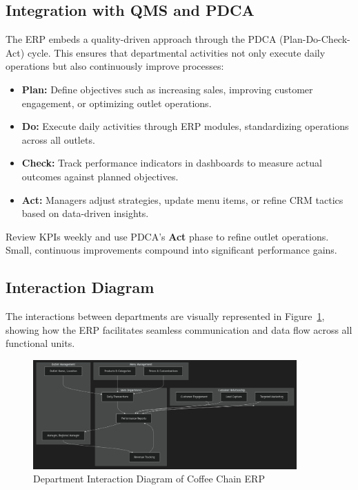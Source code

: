 \subsection*{Integration with QMS and PDCA}
The ERP embeds a quality-driven approach through the PDCA (Plan-Do-Check-Act) cycle. This ensures that departmental activities not only execute daily operations but also continuously improve processes:
\begin{itemize}
    \item \textbf{Plan:} Define objectives such as increasing sales, improving customer engagement, or optimizing outlet operations.
    \item \textbf{Do:} Execute daily activities through ERP modules, standardizing operations across all outlets.
    \item \textbf{Check:} Track performance indicators in dashboards to measure actual outcomes against planned objectives.
    \item \textbf{Act:} Managers adjust strategies, update menu items, or refine CRM tactics based on data-driven insights.
\end{itemize}

\begin{tcolorbox}[colback=white,colframe=odooPurple,title=Tip, fonttitle=\bfseries, coltitle=white]
Review KPIs weekly and use PDCA’s \textbf{Act} phase to refine outlet operations. 
Small, continuous improvements compound into significant performance gains.
\end{tcolorbox}

\subsection*{Interaction Diagram}
The interactions between departments are visually represented in Figure~\ref{fig:dept_interaction}, showing how the ERP facilitates seamless communication and data flow across all functional units.
\begin{figure}[H]
\centering
\includegraphics[width=0.9\textwidth,height=0.5\textheight,keepaspectratio]{diagrams/department.png}
\caption{Department Interaction Diagram of Coffee Chain ERP}
\label{fig:dept_interaction}
\end{figure}


